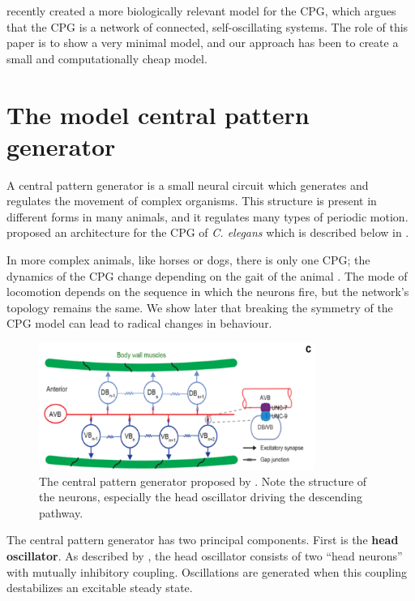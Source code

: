 \documentclass[
    11pt,
]{article}
\begin{document}
\citet{olivares2019} recently created a more biologically relevant model for the CPG, which argues that the CPG is a network of connected, self-oscillating systems.  The role of this paper is to show a very minimal model, and our approach has been to create a small and computationally cheap model.

\section{The model central pattern generator}


A central pattern generator is a small neural circuit which generates and regulates the movement of complex organisms.  This structure is present in different forms in many animals, and it regulates many types of periodic motion.  \citet{xu2018} proposed an architecture for the CPG of \emph{C. elegans} which is described below in .

In more complex animals, like horses or dogs, there is only one CPG; the dynamics of the CPG change depending on the gait of the animal \citep{collins1994}.  The mode of locomotion depends on the sequence in which the neurons fire, but the network's topology remains the same.  We show later that breaking the symmetry of the CPG model can lead to radical changes in behaviour.

\begin{figure}[h!]
    \centering
    \includegraphics[width=9cm]{figures/xu_cpg/xu_cpg.png}
    \caption{The central pattern generator proposed by \citet{xu2018}.  Note the structure of the neurons, especially the head oscillator driving the descending pathway.}
    \label{fig: xu_cpg}
\end{figure}

The central pattern generator has two principal components.  First is the \textbf{head oscillator}. As described by \citet{gjorgjieva2014}, the head oscillator consists of two “head neurons” with mutually inhibitory coupling.  Oscillations are generated when this coupling destabilizes an excitable steady state.
\end{document}
